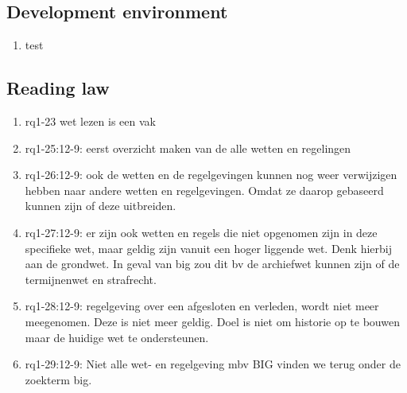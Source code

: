 \subsection{Development environment}
\begin{comment}
plaats hier de afgehandelde items.
\end{comment}
\begin{enumerate}
    \item test
\end{enumerate}

\subsection{Reading law}
\begin{comment}
Hoort dit niet bij rq3?
plaats hier de afgehandelde items.
\end{comment}
\begin{enumerate}
    \item rq1-23 wet lezen is een vak 
    \item rq1-25:12-9: eerst overzicht maken van de alle wetten en regelingen
    \item rq1-26:12-9: ook de wetten en de regelgevingen kunnen nog weer verwijzigen hebben naar andere wetten en regelgevingen. Omdat ze daarop gebaseerd kunnen zijn of deze uitbreiden.
    \item rq1-27:12-9: er zijn ook wetten en regels die niet opgenomen zijn in deze specifieke wet, maar geldig zijn vanuit een hoger liggende wet. 
    Denk hierbij aan de grondwet. 
    In geval van big zou dit bv de archiefwet kunnen zijn of de termijnenwet en strafrecht.
    \item rq1-28:12-9: regelgeving over een afgesloten en verleden, wordt niet meer meegenomen. 
    Deze is niet meer geldig. 
    Doel is niet om historie op te bouwen maar de huidige wet te ondersteunen.
    \item rq1-29:12-9: Niet alle wet- en regelgeving mbv BIG vinden we terug onder de zoekterm big.
\end{enumerate}

